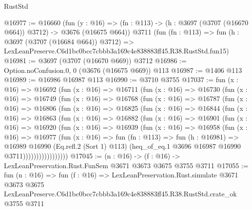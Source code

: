 \begin{lexlean}{RustStd}
\begin{coremodule}
@16977 := @16660
    (fun (y : @16) => (fn : @113) -> (h : @3697 (@3707 (@16670 @664)) @3712) -> @3676 (@16675 @664))
    @3711
    (fun (fn : @113) =>
    fun (h : @3697 (@3707 (@16684 @664)) @3712) =>
    LexLeanPreserve.C6d1bc0bcc7cbbb3a169c4e838883ff45.R38.RustStd.fun15)
@16981 := @3697 (@3707 (@16670 @669)) @3712
@16986 := Option.noConfusion.{0, 0} (@3676 (@16675 @669)) @113
@16987 := @1406 @113
@16989 := @16986 @16987 @113
@16990 := @3710 @3755
@17037 := fun (x : @16) =>
  @16692
    (fun (x : @16) =>
    @16711
      (fun (x : @16) =>
      @16730
        (fun (x : @16) =>
        @16749
          (fun (x : @16) =>
          @16768
            (fun (x : @16) =>
            @16787
              (fun (x : @16) =>
              @16806
                (fun (x : @16) =>
                @16825
                  (fun (x : @16) =>
                  @16844
                    (fun (x : @16) =>
                    @16863
                      (fun (x : @16) =>
                      @16882
                        (fun (x : @16) =>
                        @16901
                          (fun (x : @16) =>
                          @16920
                            (fun (x : @16) =>
                            @16939
                              (fun (x : @16) =>
                              @16958
                                (fun (x : @16) =>
                                @16977
                                  (fun (x : @16) =>
                                  fun (fn : @113) =>
                                  fun (h : @16981) =>
                                  @16989
                                    @16990
                                    (Eq.refl.{2} (Sort 1) @113)
                                    (heq_of_eq.{1} @3696 @16987 @16990 @3711)))))))))))))))))
@17045 := (n : @16) -> (f : @16) -> LexLeanPreservation.Rust.FunSem @3671 @3673 @3675 @3755 @3711
@17055 := fun (n : @16) =>
  fun (f : @16) =>
  LexLeanPreservation.Rust.simulate
    @3671
    @3673
    @3675
    LexLeanPreserve.C6d1bc0bcc7cbbb3a169c4e838883ff45.R38.RustStd.crate_ok
    @3755
    @3711
\end{coremodule}
\end{lexlean}
